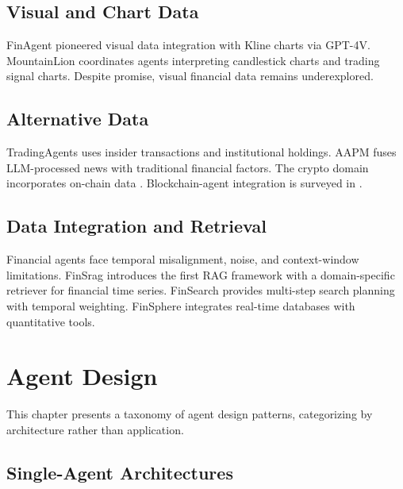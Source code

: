 \documentclass[12pt]{report}
\begin{document}
\section{Visual and Chart Data}

FinAgent \citep{zhang2024finagent} pioneered visual data integration with Kline charts via GPT-4V. MountainLion \citep{wu2025mountainlion} coordinates agents interpreting candlestick charts and trading signal charts. Despite promise, visual financial data remains underexplored.

\section{Alternative Data}

TradingAgents \citep{xiao2024tradingagents} uses insider transactions and institutional holdings. AAPM \citep{cheng2024aapm} fuses LLM-processed news with traditional financial factors. The crypto domain incorporates on-chain data \citep{luo2025cryptoportfolio}. Blockchain-agent integration is surveyed in \citet{blockchain2026agents}.

\section{Data Integration and Retrieval}

Financial agents face temporal misalignment, noise, and context-window limitations. FinSrag \citep{xiao2025finsrag} introduces the first RAG framework with a domain-specific retriever for financial time series. FinSearch \citep{tian2025finsearch} provides multi-step search planning with temporal weighting. FinSphere \citep{han2025finsphere} integrates real-time databases with quantitative tools.


\chapter{Agent Design}

This chapter presents a taxonomy of agent design patterns, categorizing by architecture rather than application.

\section{Single-Agent Architectures}
\end{document}

